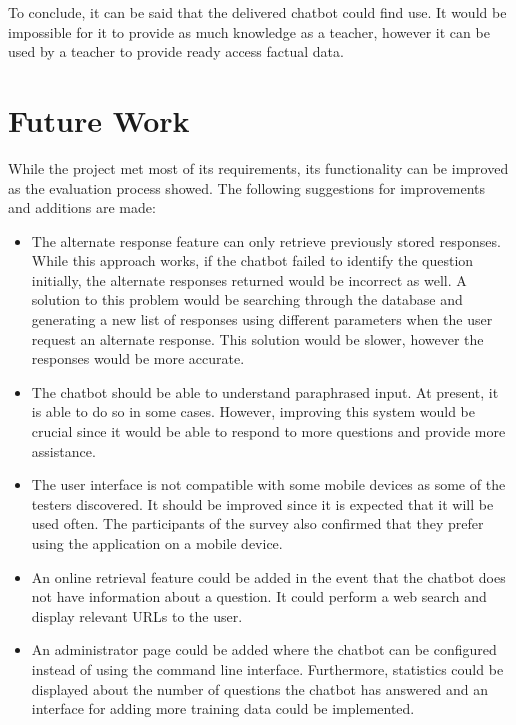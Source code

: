\documentclass[12pt,a4paper]{article}
\begin{document}
To conclude, it  can be said that the delivered chatbot could find use. It would be impossible for it to provide as much knowledge as a teacher, however it can be used by a teacher to provide ready access factual data. 

\newpage
\section{Future Work}
While the project met most of its requirements, its functionality can be improved as the evaluation process showed. The following suggestions for improvements and additions are made:
\begin{itemize}
	\item The alternate response feature can only retrieve previously stored responses. While this approach works, if the chatbot failed to identify the question initially, the alternate responses returned would be incorrect as well. A solution  to this problem would be searching through the database and generating a new list of responses using different parameters when the user request an alternate response. This solution would be slower, however the responses would be more accurate.
	\item The chatbot should be able to understand paraphrased input. At present, it is able to do so in some cases. However, improving this system would be crucial since it would be able to respond to more questions and provide more assistance.
	\item The user interface is not compatible with some mobile devices as some of the testers discovered. It should be improved since it is expected that it will be used often. The participants of the survey also confirmed that they prefer using the application on a mobile device.
	\item An online retrieval feature could be added in the event that the chatbot does not have information about a question. It could perform a web search and display relevant URLs to the user.
	\item An administrator page could be added where the chatbot can be configured instead of using the command line interface. Furthermore, statistics could be displayed about the number of questions the chatbot has answered and an interface for adding more training data could be implemented.
\end{itemize}

\newpage
%
%
\printbibliography[
	heading=bibintoc,
	title={References}
]
\end{document}
